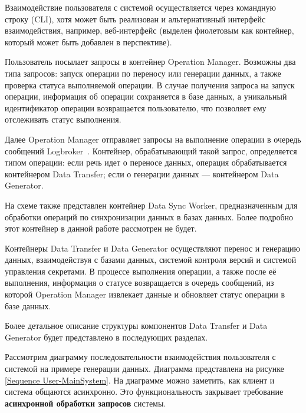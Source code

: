 Взаимодействие пользователя с системой осуществляется через командную строку (CLI), хотя может быть реализован и альтернативный интерфейс взаимодействия, например, веб-интерфейс (выделен фиолетовым как контейнер, который может быть добавлен в перспективе).

Пользователь посылает запросы в контейнер Operation Manager. Возможны два типа запросов: запуск операции по переносу или генерации данных, а также проверка статуса выполняемой операции. В случае получения запроса на запуск операции, информация об операции сохраняется в базе данных, а уникальный идентификатор операции возвращается пользователю, что позволяет ему отслеживать статус выполнения.

Далее Operation Manager отправляет запросы на выполнение операции в очередь сообщений Logbroker~\cite{logbroker}. Контейнер, обрабатывающий такой запрос, определяется типом операции: если речь идет о переносе данных, операция обрабатывается контейнером Data Transfer; если о генерации данных — контейнером Data Generator.

На схеме также представлен контейнер Data Sync Worker, предназначенным для обработки операций по синхронизации данных в базах данных. Более подробно этот контейнер в данной работе рассмотрен не будет.

Контейнеры Data Transfer и Data Generator осуществляют перенос и генерацию данных, взаимодействуя с базами данных, системой контроля версий и системой управления секретами. В процессе выполнения операции, а также после её выполнения, информация о статусе возвращается в очередь сообщений, из которой Operation Manager извлекает данные и обновляет статус операции в базе данных.

Более детальное описание структуры компонентов Data Transfer и Data Generator будет представлено в последующих разделах.

Рассмотрим диаграмму последовательности взаимодействия пользователя с системой на примере генерации данных. Диаграмма представлена на рисунке \ref{Sequence User-MainSystem}. На диаграмме можно заметить, как клиент и система общаются асинхронно. Это функциональность закрывает требование \textbf{асинхронной обработки запросов} системы.

